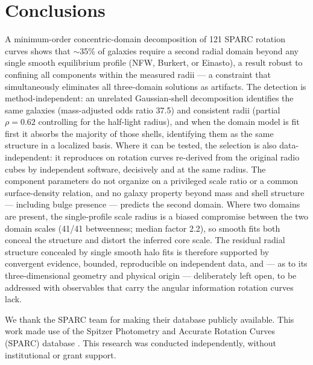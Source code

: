 \documentclass[twocolumn]{aastex701}
\begin{document}
\section{Conclusions} \label{sec:conclusions}

A minimum-order concentric-domain decomposition of 121 SPARC rotation curves
shows that $\sim$35\% of galaxies require a second radial domain beyond any
single smooth equilibrium profile (NFW, Burkert, or Einasto), a result robust
to confining all components within the measured radii --- a constraint that
simultaneously eliminates all three-domain solutions as artifacts. The
detection is method-independent: an unrelated Gaussian-shell decomposition
identifies the same galaxies (mass-adjusted odds ratio 37.5) and consistent
radii (partial $\rho = 0.62$ controlling for the half-light radius), and when
the domain model is fit first it absorbs the majority of those shells,
identifying them as the same structure in a localized basis. Where it can be
tested, the selection is also data-independent: it reproduces on rotation curves
re-derived from the original radio cubes by independent software, decisively and
at the same radius. The
component parameters do not organize on a privileged scale ratio or a common
surface-density relation, and no galaxy property beyond mass and shell
structure --- including bulge presence --- predicts the second domain. Where
two domains are present, the single-profile scale radius is a biased
compromise between the two domain scales (41/41 betweenness; median factor
2.2), so smooth fits both conceal the structure and distort the inferred
core scale. The residual radial structure concealed
by single smooth halo fits is therefore supported by convergent evidence,
bounded, reproducible on independent data, and --- as to its three-dimensional
geometry and physical origin --- deliberately left open, to be addressed with
observables that carry the angular information rotation curves lack.

\begin{acknowledgments}
We thank the SPARC team for making their database publicly available. This
work made use of the Spitzer Photometry and Accurate Rotation Curves (SPARC)
database \citep{Lelli2016}. This research was conducted independently, without
institutional or grant support.
\end{acknowledgments}

\end{document}
